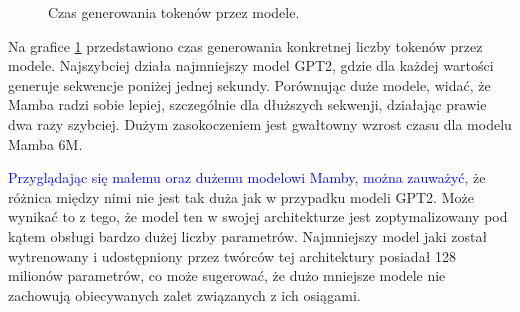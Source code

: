 \documentclass[data-science]{agh-wi} %
\begin{document}
\begin{figure}
    \centering
    \caption{Czas generowania tokenów przez modele.}\label{fig:time_generate}
\end{figure}

Na grafice \ref*{fig:time_generate} przedstawiono czas generowania konkretnej liczby tokenów przez modele. Najszybciej działa najmniejszy model GPT2, gdzie dla każdej wartości generuje sekwencje poniżej jednej sekundy. Porównując duże modele, widać, że Mamba radzi sobie lepiej, szczególnie dla dłuższych sekwenji, działając prawie dwa razy szybciej. Dużym zasokoczeniem jest gwałtowny wzrost czasu dla modelu Mamba 6M.

\textcolor{blue}{Przyglądając się małemu oraz dużemu modelowi Mamby, można zauważyć, }że różnica między nimi nie jest tak duża jak w przypadku modeli GPT2. Może wynikać to z tego, że model ten w swojej architekturze jest zoptymalizowany pod kątem obsługi bardzo dużej liczby parametrów. Najmniejszy model jaki został wytrenowany i udostępniony przez twórców tej architektury posiadał 128 milionów parametrów, co może sugerować, że dużo mniejsze modele nie zachowują obiecywanych zalet związanych z ich osiągami.
\end{document}
